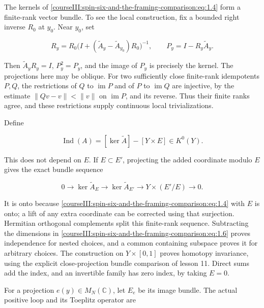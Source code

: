 The kernels of \eqref{courseIII:spin-six-and-the-framing-comparison:eq:1.4} form a finite-rank vector bundle. To see the local construction, fix a bounded right inverse \(R_0\) at \(y_0\). Near \(y_0\), set

\begin{equation}
R_y=R_0\bigl(I+(\widetilde A_y-\widetilde A_{y_0})R_0\bigr)^{-1},
\qquad P_y=I-R_y\widetilde A_y.
\label{courseIII:spin-six-and-the-framing-comparison:eq:1.5}
\end{equation}

Then \(\widetilde A_yR_y=I\), \(P_y^2=P_y\), and the image of \(P_y\) is precisely the kernel. The projections here may be oblique. For two sufficiently close finite-rank idempotents \(P,Q\), the restrictions of \(Q\) to \(\operatorname{im}P\) and of \(P\) to \(\operatorname{im}Q\) are injective, by the estimate \(\|Qv-v\|<\|v\|\) on \(\operatorname{im}P\), and its reverse. Thus their finite ranks agree, and these restrictions supply continuous local trivializations.

Define

\begin{equation}
\operatorname{Ind}(A)=[\ker\widetilde A]-[Y\times E]\in K^0(Y).
\label{courseIII:spin-six-and-the-framing-comparison:eq:1.6}
\end{equation}

This does not depend on \(E\). If \(E\subset E'\), projecting the added coordinate modulo \(E\) gives the exact bundle sequence

\begin{equation}
0\longrightarrow\ker\widetilde A_E
\longrightarrow\ker\widetilde A_{E'}
\longrightarrow Y\times(E'/E)\longrightarrow0.
\label{courseIII:spin-six-and-the-framing-comparison:eq:1.7}
\end{equation}

It is onto because \eqref{courseIII:spin-six-and-the-framing-comparison:eq:1.4} with \(E\) is onto; a lift of any extra coordinate can be corrected using that surjection. Hermitian orthogonal complements split this finite-rank sequence. Subtracting the dimensions in \eqref{courseIII:spin-six-and-the-framing-comparison:eq:1.6} proves independence for nested choices, and a common containing subspace proves it for arbitrary choices. The construction on \(Y\times[0,1]\) proves homotopy invariance, using the explicit close-projection bundle comparison of lesson 11. Direct sums add the index, and an invertible family has zero index, by taking \(E=0\).

For a projection \(e(y)\in M_N(\mathbb C)\), let \(E_e\) be its image bundle. The actual positive loop and its Toeplitz operator are


